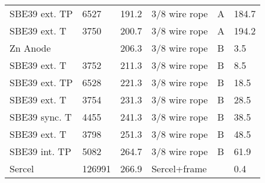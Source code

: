 \documentclass{article}
\begin{document}
\begin{table}[!htbp]
\begin{tabular}{llllll}
SBE39 ext. TP & 6527 & 191.2 & 3/8 wire rope & A & 184.7 \\
SBE39 ext. T & 3750 & 200.7 & 3/8 wire rope & A & 194.2 \\
Zn Anode &  & 206.3 & 3/8 wire rope & B & 3.5 \\
SBE39 ext. T & 3752 & 211.3 & 3/8 wire rope & B & 8.5 \\
SBE39 ext. TP & 6528 & 221.3 & 3/8 wire rope & B & 18.5 \\
SBE39 ext. T & 3754 & 231.3 & 3/8 wire rope & B & 28.5 \\
SBE39 sync. T & 4455 & 241.3 & 3/8 wire rope & B & 38.5 \\
SBE39 ext. T & 3798 & 251.3 & 3/8 wire rope & B & 48.5 \\
SBE39 int. TP & 5082 & 264.7 & 3/8 wire rope & B & 61.9 \\
Sercel & 126991 & 266.9 & Sercel+frame &  & 0.4 \\
\bottomrule
\end{tabular}
\end{table}
\end{document}
